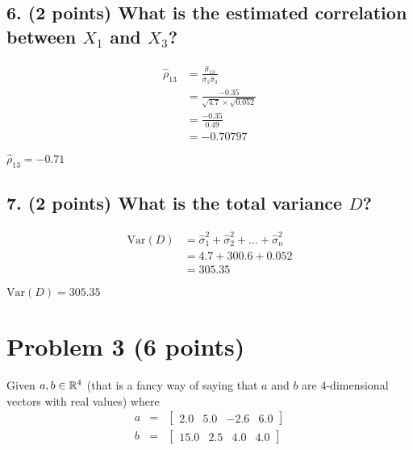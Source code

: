\documentclass[11pt]{article}
\begin{document}
\subsection*{\textbf{6. (2 points)} What is the estimated correlation between $X_1$ and $X_3$?}


\begin{align*}
    \hat{\rho}_{13} &= \frac{\hat{\sigma}_{13}}{\hat{\sigma}_1 \hat{\sigma}_3} \\
    &= \frac{-0.35}{ \sqrt{4.7} \times \sqrt{0.052}} \\
    &= \frac{-0.35}{0.49} \\
    &= -0.70797
\end{align*}

\begin{tcolorbox}[title=Problem 2.6]
    $\hat{\rho}_{13} = -0.71$
\end{tcolorbox}

\subsection*{\textbf{7. (2 points)} What is the total variance $D$?}

\begin{align*}
    \text{Var}(D) &= \hat{\sigma}_1^2 + \hat{\sigma}_2^2 + \dots + \hat{\sigma}_n^2 \\
    & = 4.7 + 300.6 + 0.052 \\
    & = 305.35
\end{align*}

\begin{tcolorbox}[title=Problem 2.7]
    $\text{Var}(D) = 305.35$
\end{tcolorbox}

\newpage
\section*{Problem 3 (6 points)}

Given $a, b \in \mathbb{R}^4$ (that is a fancy way of saying that $a$ and $b$ are
4-dimensional vectors with real values) where
\begin{eqnarray*}
    a &=& \begin{bmatrix} 2.0  & 5.0 & -2.6 & 6.0 \end{bmatrix} \\
    b &=& \begin{bmatrix} 15.0 & 2.5 &  4.0 & 4.0 \end{bmatrix}
\end{eqnarray*}
\end{document}
